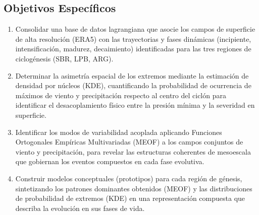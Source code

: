\subsection{Objetivos Específicos}
\begin{enumerate}
    \item Consolidar una base de datos lagrangiana que asocie los campos de superficie de alta resolución (ERA5) con las trayectorias y fases dinámicas (incipiente, intensificación, madurez, decaimiento) identificadas para las tres regiones de ciclogénesis (SBR, LPB, ARG).
    \item Determinar la asimetría espacial de los extremos mediante la estimación de densidad por núcleos (KDE), cuantificando la probabilidad de ocurrencia de máximos de viento y precipitación respecto al centro del ciclón para identificar el desacoplamiento físico entre la presión mínima y la severidad en superficie.
    \item Identificar los modos de variabilidad acoplada aplicando Funciones Ortogonales Empíricas Multivariadas (MEOF) a los campos conjuntos de viento y precipitación, para revelar las estructuras coherentes de mesoescala que gobiernan los eventos compuestos en cada fase evolutiva.
    \item Construir modelos conceptuales (prototipos) para cada región de génesis, sintetizando los patrones dominantes obtenidos (MEOF) y las distribuciones de probabilidad de extremos (KDE) en una representación compuesta que describa la evolución en sus fases de vida.
\end{enumerate}